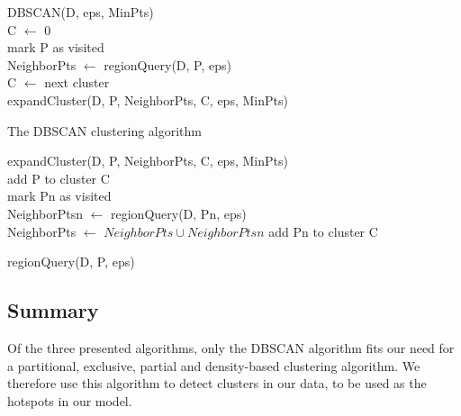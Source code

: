 \begin{algorithm}[h]
\SetAlgoNoEnd
DBSCAN(D, eps, MinPts)\\
	C $\leftarrow$ 0\\
	{
  	mark P as visited\\
		NeighborPts $\leftarrow$ regionQuery(D, P, eps)\\
		{
			C $\leftarrow$ next cluster\\
			expandCluster(D, P, NeighborPts, C, eps, MinPts)
		}
	}
\caption{The DBSCAN clustering algorithm}\label{dbscan-algo}
\phantom{ForLineBreak}
\setcounter{AlgoLine}{0}

expandCluster(D, P, NeighborPts, C, eps, MinPts)\\
	add P to cluster C\\
	{
		{
			mark Pn as visited\\
			NeighborPtsn $\leftarrow$ regionQuery(D, Pn, eps)\\
					{
						NeighborPts $\leftarrow$ $ NeighborPts \cup NeighborPtsn $
					}
		}
					{
						{add Pn to cluster C\\}
					}
	}
\phantom{ForLineBreak}
\setcounter{AlgoLine}{0}

regionQuery(D, P, eps)\\
\end{algorithm}

\subsection{Summary} Of the three presented algorithms, only the DBSCAN algorithm fits our need for a partitional, exclusive, partial and density-based clustering algorithm.
We therefore use this algorithm to detect clusters in our data, to be used as the hotspots in our model.
